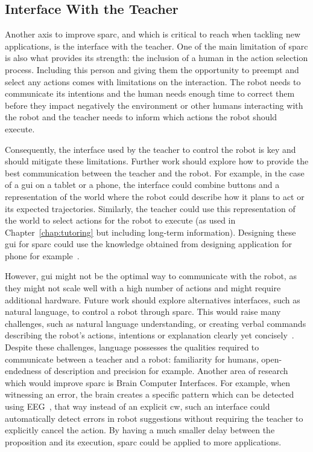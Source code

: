\subsection{Interface With the Teacher}\label{sec:disc_future_interface}

Another axis to improve \gls{sparc}, and which is critical to reach when tackling new applications, is the interface with the teacher. One of the main limitation of \gls{sparc} is also what provides its strength: the inclusion of a human in the action selection process. Including this person and giving them the opportunity to preempt and select any actions comes with limitations on the interaction. The robot needs to communicate its intentions and the human needs enough time to correct them before they impact negatively the environment or other humans interacting with the robot and the teacher needs to inform which actions the robot should execute. %

Consequently, the interface used by the teacher to control the robot is key and should mitigate these limitations. Further work should explore how to provide the best communication between the teacher and the robot. For example, in the case of a \gls{gui} on a tablet or a phone, the interface could combine buttons and a representation of the world where the robot could describe how it plans to act or its expected trajectories. Similarly, the teacher could use this representation of the world to select actions for the robot to execute (as used in Chapter~\ref{chap:tutoring} but including long-term information). Designing these \gls{gui} for \gls{sparc} could use the knowledge obtained from designing application for phone for example~\citep{joorabchi2013real}. 

However, \gls{gui} might not be the optimal way to communicate with the robot, as they might not scale well with a high number of actions and might require additional hardware. Future work should explore alternatives interfaces, such as natural language, to control a robot through \gls{sparc}. This would raise many challenges, such as natural language understanding, or creating verbal commands describing the robot's actions, intentions or explanation clearly yet concisely~\citep{hayes2017improving}. Despite these challenges, language possesses the qualities required to communicate between a teacher and a robot: familiarity for humans, open-endedness of description and precision for example. Another area of research which would improve \gls{sparc} is Brain Computer Interfaces. For example, when witnessing an error, the brain creates a specific pattern which can be detected using EEG~\citep{gehring1993neural}, that way instead of an explicit \gls{cw}, such an interface could automatically detect errors in robot suggestions without requiring the teacher to explicitly cancel the action. By having a much smaller delay between the proposition and its execution, \gls{sparc} could be applied to more applications.

